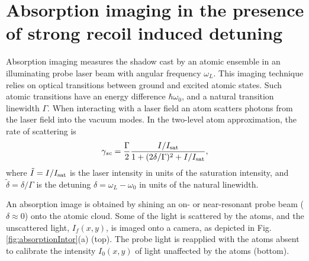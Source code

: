 \documentclass[12pt]{iopart}
\begin{document}
\section{Absorption imaging in the presence of strong recoil induced detuning}
\label{sec:2}
Absorption imaging measures the shadow cast by an atomic ensemble in an illuminating probe laser beam with angular frequency $\omega_L$. This imaging technique relies on optical transitions between ground and excited atomic states. Such atomic transitions have an energy difference $\hbar\omega_0$, and a natural transition linewidth $\Gamma$. When interacting with a laser field an atom scatters photons from the laser field into the vacuum modes. In the two-level atom approximation, the rate of scattering is \cite{LCT}
\begin{equation}
\gamma_{sc}= \frac{\Gamma}{2} \frac{I/I_{\rm{sat}}}{1+(2\delta/\Gamma)^2 +I/I_{\rm{sat}}},
\label{eq:scatrate}
\end{equation}
where $\tilde{I}=I/I_{\rm{sat}}$ is the laser intensity in units of the saturation intensity, and $\tilde{\delta}=\delta/\Gamma$ is the detuning $\delta=\omega_L-\omega_0$ in units of the natural linewidth. 
\par An absorption image is obtained by shining an on- or near-resonant probe beam ($\delta\approx0$) onto the atomic cloud. Some of the light is scattered by the atoms, and the unscattered light, $I_f(x,y)$, is imaged onto a camera, as depicted in Fig. \ref{fig:absorptionIntor}(a) (top). The probe light is reapplied with the atoms absent to calibrate the intensity $I_0(x,y)$ of light unaffected by the atoms (bottom).
\end{document}
